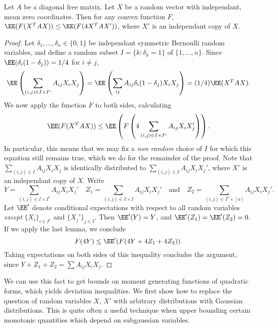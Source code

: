 \begin{theorem}
    Let $A$ be a diagonal free matrix. Let $X$ be a random vector with independant, mean zero coordinates. Then for any convex function $F$, $\EE(F(X^T A X)) \leq \EE(F(4 X^T A X'))$, where $X'$ is an independant copy of $X$.
\end{theorem}
\begin{proof}
    Let $\delta_1, \dots, \delta_n \in \{ 0, 1 \}$ be independant symmetric Bernoulli random variables, and define a random subset $I = \{ k : \delta_k = 1 \}$ of $\{ 1, \dots, n \}$. Since $\EE(\delta_i(1 - \delta_j)) = 1/4$ for $i \neq j$,
    \[ \EE \left( \sum_{(i,j) \in I \times I^c} A_{ij} X_i X_j \right) = \EE \left( \sum_{ij} A_{ij} \delta_i (1 - \delta_j) X_i X_j \right) = (1/4) \EE(X^TAX). \]
    We now apply the function $F$ to both sides, calculating
    \[ \EE(F(X^T A X)) \leq \EE \left(F \left( 4 \sum_{(i,j) \in I \times I^c} A_{ij} X_i X_j' \right) \right). \]
    In particular, this means that we may fix a \emph{non random} choice of $I$ for which this equation still remains true, which we do for the remainder of the proof. Note that $\sum_{(i,j) \in I} A_{ij} X_i X_j$ is identically distributed to $\sum_{(i,j) \in I} A_{ij} X_i X_j'$, where $X'$ is an independant copy of $X$. Write
    \[ Y = \sum_{(i,j) \in I \times I^c} A_{ij} X_i X_j'\quad Z_1 = \sum_{(i,j) \in I \times I} A_{ij} X_i X_j'\quad \text{and}\quad Z_2 = \sum_{(i,j) \in I^c \times [n]} A_{ij} X_i X_j'. \]
    Let $\EE'$ denote conditional expectations with respect to all random variables \emph{except} $\{ X_i \}_{i \in I^c}$ and $\{ X_j' \}_{j \in I}$. Then $\EE'(Y) = Y$, and $\EE'(Z_1) = \EE'(Z_2) = 0$. If we apply the last lemma, we conclude
    \[ F(4Y) \leq \EE'(F(4Y + 4Z_1 + 4Z_2)). \]
    Taking expectations on both sides of this inequality concludes the argument, since $Y + Z_1 + Z_2 = \sum A_{ij} X_i X_j$.
\end{proof}

We can use this fact to get bounds on moment generating functions of quadratic forms, which yields deviation inequalities. We first show how to replace the question of random variables $X$, $X'$ with arbitrary distributions with Gaussian distributions. This is quite often a useful technique when upper bounding certain monotonic quantities which depend on subgaussian variables.


